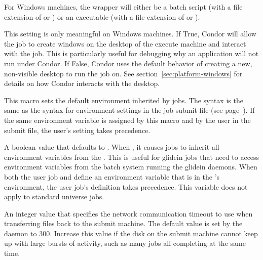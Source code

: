 \begin{description}
  For Windows machines, the wrapper will either be
  a batch script (with a file extension of  or )
  or an executable (with a file extension of  or ).

\item[\Macro{USE\_VISIBLE\_DESKTOP}] \label{param:UseVisibleDesktop} 
  This setting is only meaningful on Windows machines.  If True, Condor will
  allow the job to create windows on the desktop of the execute machine and
  interact with the job.  This is particularly useful for debugging why an
  application will not run under Condor.  If False, Condor uses the default
  behavior of creating a new, non-visible desktop to run the job on.
  See section~\ref{sec:platform-windows} for details on how Condor 
  interacts with the desktop.

\item[\Macro{STARTER\_JOB\_ENVIRONMENT}] \label{param:StarterJobEnvironment}
  This macro sets the default environment inherited by jobs.  The syntax is
  the same as the syntax for environment settings in the job submit file
  (see page~\pageref{man-condor-submit-environment}).
  If the same environment variable is assigned by this macro and by the user
  in the submit file, the user's setting takes precedence.

\item[\Macro{JOB\_INHERITS\_STARTER\_ENVIRONMENT}]
\label{param:JobInheritsStarterEnvironment} 
A boolean value that defaults to .
When ,
it causes jobs to inherit all environment variables from 
the .
This is useful for glidein jobs that need to
access environment variables from the batch system running the glidein
daemons.
When both the user job and  define
an environment variable that is in the 's
environment, the user job's definition takes precedence.
This variable does not apply to standard universe jobs.

\item[\Macro{STARTER\_UPLOAD\_TIMEOUT}]
\label{param:StarterUploadTimeout} 
An integer value that specifies the network communication timeout to use
when transferring files back to the submit machine.  The default value is
set by the  daemon to 300.
Increase this value if the disk on the submit machine
cannot keep up with large bursts of activity, such as many jobs all
completing at the same time.

\end{description}

